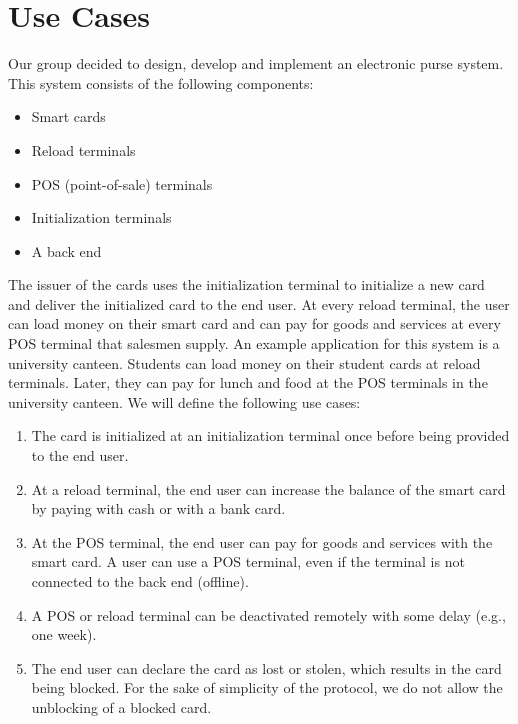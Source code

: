 


\maketitle



\section{Use Cases}
Our group decided to design, develop and implement an electronic purse system.
This system consists of the following components:
\begin{itemize}
    \item Smart cards
    \item Reload terminals
    \item POS (point-of-sale) terminals
    \item Initialization terminals
    \item A back end
\end{itemize}
The issuer of the cards uses the initialization terminal to initialize a new card and deliver the initialized card to the end user.
At every reload terminal, the user can load money on their smart card and can pay for goods and services at every POS terminal that salesmen supply.
An example application for this system is a university canteen.
Students can load money on their student cards at reload terminals.
Later, they can pay for lunch and food at the POS terminals in the university canteen.
We will define the following use cases:
\begin{enumerate}[label={UC\arabic*:}, ref={UC\arabic*}, leftmargin=3\parindent]
    \item \label{uc:person} The card is initialized at an initialization terminal once before being provided to the end user.
    
    \item \label{uc:reload} At a reload terminal, the end user can increase the balance of the smart card by paying with cash or with a bank card.
    
    \item \label{uc:payment} At the POS terminal, the end user can pay for goods and services with the smart card.
    A user can use a POS terminal, even if the terminal is not connected to the back end (offline).

    \item A POS or reload terminal can be deactivated remotely with some delay (e.g., one week).
    
    \item The end user can declare the card as lost or stolen, which results in the card being blocked.
    For the sake of simplicity of the protocol, we do not allow the unblocking of a blocked card.
    
\end{enumerate}
